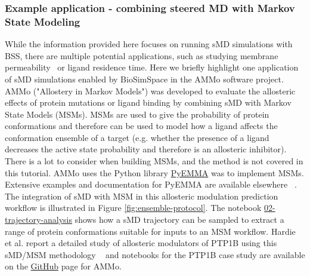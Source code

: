 \subsubsection{Example application - combining steered MD with Markov State Modeling}
While the information provided here focuses on running sMD simulations with BSS, there are multiple potential applications, such as studying membrane permeability~\cite{Wells2007} or ligand residence time\cite{Potterton2019}. Here we briefly highlight one application of sMD simulations enabled by BioSimSpace in the AMMo software project. AMMo ("Allostery in Markov Models") was developed to evaluate the allosteric effects of protein mutations or ligand binding by combining sMD with Markov State Models (MSMs). MSMs are used to give the probability of protein conformations and therefore can be used to model how a ligand affects the conformation ensemble of a target (e.g. whether the presence of a ligand decreases the active state probability and therefore is an allosteric inhibitor). 
 There is a lot to consider when building MSMs, and the method is not covered in this tutorial. AMMo uses the Python library \href{http://emma-project.org/latest/}{PyEMMA} was to implement MSMs. Extensive examples and documentation for PyEMMA are available elsewhere ~\cite{Wehmeyer_2019}. The integration of sMD with MSM in this allosteric modulation prediction workflow is illustrated in Figure \ref{fig:ensemble-protocol}. The notebook \href{https://github.com/OpenBioSim/BioSimSpaceTutorials/blob/main/03_steered_md/02_trajectory_analysis.ipynb}{02-trajectory-analysis} shows how a sMD trajectory can be sampled to extract a range of protein conformations suitable for inputs to an MSM workflow. Hardie et al. report a detailed study of allosteric modulators of PTP1B using this sMD/MSM methodology ~\cite{Hardie2023} and notebooks for the PTP1B case study are available on the \href{https://github.com/michellab/AMMo/tree/main/examples/ptp1b}{GitHub} page for AMMo.

